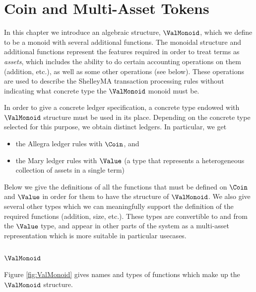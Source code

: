 \section{Coin and Multi-Asset Tokens}
\label{sec:coin-ma}

In this chapter we introduce an algebraic structure, $\ValMonoid$,
which we define to be a monoid with several additional functions.
The monoidal structure and additional functions represent the
features required in order to treat terms as \emph{assets},
which includes the ability to do certain accounting operations on them (addition, etc.),
as well as some other operations (see below).
These operations are used to describe the ShelleyMA transaction processing rules
without indicating what concrete type the $\ValMonoid$ monoid must be.

In order to give a concrete ledger specification, a concrete type
endowed with $\ValMonoid$ structure must be used in its place.
Depending on the concrete type selected for this purpose,
we obtain distinct ledgers. In particular, we get

\begin{itemize}
  \item the Allegra ledger rules with $\Coin$, and
  \item the Mary ledger rules with $\Value$ (a type that represents a heterogeneous collection of assets in a
  single term)
\end{itemize}

Below we give the definitions of all the functions that must be defined on
$\Coin$ and $\Value$ in order for them to have the structure of $\ValMonoid$.
We also give several other types which we can meaningfully
support the definition of the required functions (addition, size, etc.).
These types are convertible to and from the $\Value$ type, and appear in other
parts of the system as a multi-asset representation which is more suitable in particular
usecases.

\subsection{$\ValMonoid$}

Figure \ref{fig:ValMonoid} gives names and types of functions which
make up the $\ValMonoid$ structure.

